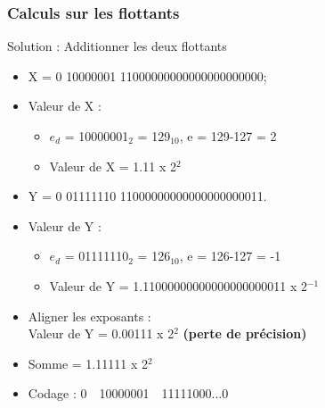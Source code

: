 \documentclass{beamer}
\begin{document}
\begin{frame}
\frametitle{Calculs sur les flottants}

\begin{block}{Solution : Additionner les deux flottants}
\begin{itemize}
\item X = 0 10000001 11000000000000000000000;
\item Valeur de X :
  \begin{itemize}
  \item $e_d$ = 10000001$_2$ = 129$_{10}$, e = 129-127 = 2
  \item Valeur de X = 1.11 x 2$^2$
  \end{itemize}
  
\item Y = 0 01111110 11000000000000000000011.
  \item Valeur de Y :
  \begin{itemize}
  \item $e_d$ = 01111110$_2$ = 126$_{10}$, e = 126-127 = -1
  \item Valeur de Y = 1.11000000000000000000011 x 2$^{-1}$
  \end{itemize}
\item Aligner les exposants :\\ Valeur de Y = 0.00111 x 2$^2$
  \textbf{(perte de précision)}
\item Somme = 1.11111 x 2$^2$
\item Codage : 0~~10000001~~11111000...0
\end{itemize}
\end{block}
\end{frame}
\end{document}
